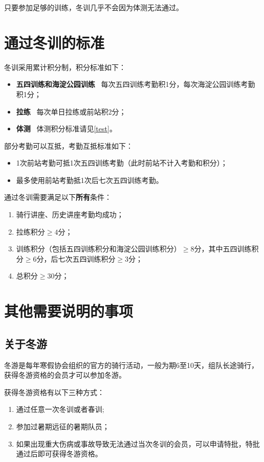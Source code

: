 \documentclass[UTF8]{ctexart}
\begin{document}
只要参加足够的训练，冬训几乎不会因为体测无法通过。 

\section{通过冬训的标准}

冬训采用累计积分制，积分标准如下：

\begin{itemize}[nosep,left=4em]
    \item \textbf{五四训练和海淀公园训练} \ 每次五四训练考勤积1分，每次海淀公园训练考勤积1分；
    \item \textbf{拉练} \  每次单日拉练或前站积2分；
    \item \textbf{体测} \  体测积分标准请见\ref{test}。 
\end{itemize}

部分考勤可以互抵，考勤互抵标准如下：

\begin{itemize}[nosep,left=4em]
    \item 1次前站考勤可抵1次五四训练考勤（此时前站不计入考勤和积分）；
    \item 最多使用前站考勤抵1次后七次五四训练考勤。 
\end{itemize}

通过冬训需要满足以下\textbf{所有}条件：
\begin{enumerate}[nosep,left=4em]
    \item 骑行讲座、历史讲座考勤均成功；
    \item 拉练积分$\ge 4$分；
    \item 训练积分（包括五四训练积分和海淀公园训练积分）$\ge 8$分，其中五四训练积分$\ge 6$分，后七次五四训练积分$\ge 3$分；
    \item 总积分$\ge 30$分；
\end{enumerate}



\section{其他需要说明的事项}

\subsection{关于冬游}

冬游是每年寒假协会组织的官方的骑行活动，一般为期6至10天，组队长途骑行，获得冬游资格的会员才可以参加冬游。

获得冬游资格有以下三种方式：
\begin{enumerate}[nosep,left=2em]
    \item 通过任意一次冬训或者春训;
    \item 参加过暑期远征的暑期队员；
    \item 如果出现重大伤病或事故导致无法通过当次冬训的会员，可以申请特批，特批通过后即可获得冬游资格。
\end{enumerate}
\end{document}
